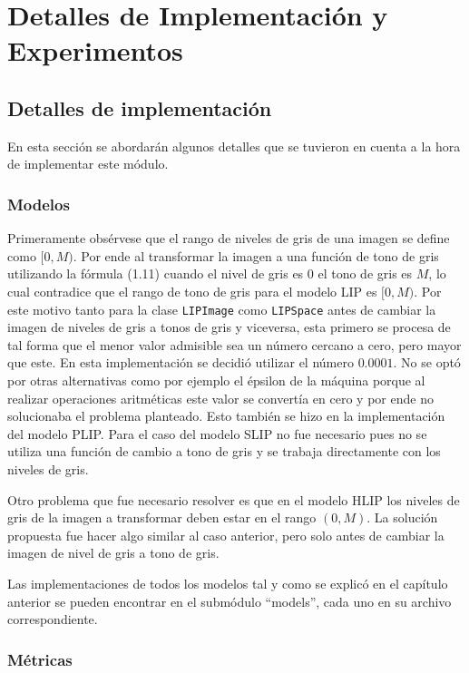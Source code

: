 \chapter{Detalles de Implementación y Experimentos}\label{chapter:implementation}

\section{Detalles de implementaci\'on}

En esta secci\'on se abordar\'an algunos detalles que se tuvieron en cuenta a la hora de implementar este m\'odulo.

\subsection{Modelos}

Primeramente obs\'ervese que el rango de niveles de gris de una imagen se define como $[0,M)$. Por ende al transformar la imagen a una funci\'on de tono de gris utilizando la f\'ormula (1.11) cuando el nivel de gris es 0 el tono de gris es $M$, lo cual contradice que el rango de tono de gris para el modelo LIP es $[0,M)$. Por este motivo tanto para la clase \verb|LIPImage| como \verb|LIPSpace| antes de cambiar la imagen de niveles de gris a tonos de gris y viceversa, esta primero se procesa de tal forma que el menor valor admisible sea un n\'umero cercano a cero, pero mayor que este. En esta implementaci\'on se decidi\'o utilizar el n\'umero $0.0001$. No se opt\'o por otras alternativas como por ejemplo el \'epsilon de la m\'aquina porque al realizar operaciones aritm\'eticas este valor se convert\'ia en cero y por ende no solucionaba el problema planteado. Esto tambi\'en se hizo en la implementaci\'on del modelo PLIP. Para el caso del modelo SLIP no fue necesario pues no se utiliza una funci\'on de cambio a tono de gris y se trabaja directamente con los niveles de gris.

Otro problema que fue necesario resolver es que en el modelo HLIP los niveles de gris de la imagen a transformar deben estar en el rango $(0,M)$. La soluci\'on propuesta fue hacer algo similar al caso anterior, pero solo antes de cambiar la imagen de nivel de gris a tono de gris.

Las implementaciones de todos los modelos tal y como se explic\'o en el cap\'itulo anterior se pueden encontrar en el subm\'odulo ``models'', cada uno en su archivo correspondiente.

\subsection{M\'etricas}

